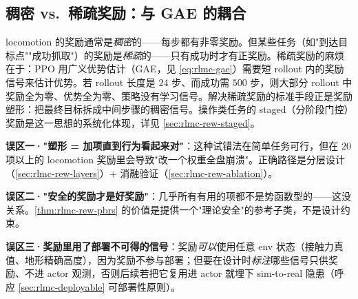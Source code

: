 \subsection{稠密 vs.\ 稀疏奖励：与 GAE 的耦合}
\label{sec:rlmc-rew-densesparse}

locomotion 的奖励通常是\emph{稠密}的——每步都有非零奖励。但某些任务（如"到达目标点""成功抓取"）的奖励是\emph{稀疏}的——只有成功时才有正奖励。稀疏奖励的麻烦在于：PPO 用广义优势估计（GAE，见 \cref{eq:rlmc-gae}）需要短 rollout 内的奖励信号来估计优势。若 rollout 长度是 $24$ 步、而成功需 $500$ 步，则大部分 rollout 中奖励全为零、优势全为零、策略没有学习信号。解决稀疏奖励的标准手段正是奖励塑形：把最终目标拆成中间步骤的稠密信号。操作类任务的 staged（分阶段门控）奖励是这一思想的系统化体现，详见 \cref{sec:rlmc-rew-staged}。

\begin{pitfall}[本节三个高频认知误区]
\textbf{误区一·"塑形 = 加项直到行为看起来对"}：这种试错法在简单任务可行，但在 $20$ 项以上的 locomotion 奖励里会导致"改一个权重全盘崩溃"。正确路径是分层设计（\cref{sec:rlmc-rew-layers}）$+$ 消融验证（\cref{sec:rlmc-rew-ablation}）。

\textbf{误区二·"安全的奖励才是好奖励"}：几乎所有有用的项都不是势函数型的——这没关系。\cref{thm:rlmc-rew-pbrs} 的价值是提供一个"理论安全"的参考子类，不是设计约束。

\textbf{误区三·奖励里用了部署不可得的信号}：奖励\emph{可以}使用任意 env 状态（接触力真值、地形精确高度），因为奖励不参与部署；但要在设计时\emph{标注}哪些信号只供奖励、不进 actor 观测，否则后续若把它复用进 actor 就埋下 sim-to-real 隐患（呼应 \cref{sec:rlmc-deployable} 可部署性原则）。
\end{pitfall}

\begin{practice}[练习·理论基础]
\end{practice}

